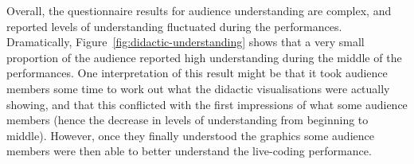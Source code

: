 Overall, the questionnaire results for audience understanding are
complex, and reported levels of understanding fluctuated during the
performances. Dramatically, Figure~\ref{fig:didactic-understanding}
shows that a very small proportion of the audience reported high
understanding during the middle of the performances. One
interpretation of this result might be that it took audience members
some time to work out what the didactic visualisations were actually
showing, and that this conflicted with the first impressions of what
some audience members (hence the decrease in levels of understanding
from beginning to middle). However, once they finally understood the
graphics some audience members were then able to better understand the
live-coding performance.




















